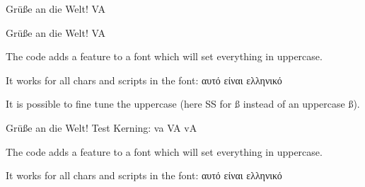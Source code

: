 \documentclass{article}
\begin{document}
Grüße an die Welt! VA

Grüße an die Welt! VA

The code adds a feature to a font which will set everything in uppercase.

It works for all chars and scripts in the font: αυτό είναι ελληνικό

It is possible to fine tune the uppercase (here SS for ß instead of an uppercase ß).

Grüße an die Welt! Test Kerning: va VA v\hbox{}A 

The code adds a feature to a font which will set everything in uppercase.

It works for all chars and scripts in the font: αυτό είναι ελληνικό
\end{document}
